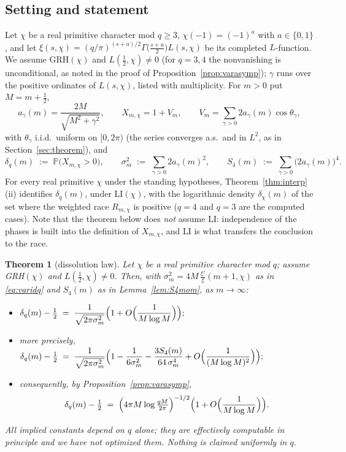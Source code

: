 \documentclass[11pt]{article}
\newtheorem{theorem}{Theorem}
\begin{document}
\subsection*{Setting and statement}

Let $\chi$ be a real primitive character mod $q\ge3$,
$\chi(-1)=(-1)^a$ with $a\in\{0,1\}$, and let
$\xi(s,\chi)=(q/\pi)^{(s+a)/2}\Gamma\bigl(\tfrac{s+a}2\bigr)L(s,\chi)$
be its completed $L$-function. We assume GRH$(\chi)$ and
$L(\tfrac12,\chi)\ne0$ (for $q=3,4$ the nonvanishing is unconditional,
as noted in the proof of Proposition~\ref{prop:varasymp}); $\gamma$
runs over the positive ordinates of $L(s,\chi)$, listed with
multiplicity. For $m>0$ put $M=m+\tfrac12$,
\[
a_\gamma(m)=\frac{2M}{\sqrt{M^2+\gamma^2}},\qquad
X_{m,\chi}=1+V_m,\qquad
V_m=\sum_{\gamma>0}2a_\gamma(m)\cos\theta_\gamma,
\]
with $\theta_\gamma$ i.i.d.\ uniform on $[0,2\pi)$ (the series
converges a.s.\ and in $L^2$, as in Section~\ref{sec:theorem}), and
\[
\delta_q(m)\;:=\;\mathbb P\bigl(X_{m,\chi}>0\bigr),
\qquad
\sigma_m^2\;:=\;\sum_{\gamma>0}2a_\gamma(m)^2,
\qquad
S_4(m)\;:=\;\sum_{\gamma>0}\bigl(2a_\gamma(m)\bigr)^4 .
\]
For every real primitive $\chi$ under the standing hypotheses,
Theorem~\ref{thm:interp}(ii) identifies $\delta_q(m)$, under
LI$(\chi)$, with the logarithmic density $\delta_\chi(m)$ of the set
where
the weighted race $R_{m,\chi}$ is positive ($q=4$ and $q=3$ are the
computed cases). Note that the theorem
below does \emph{not} assume LI: independence of the phases is built
into the definition of $X_{m,\chi}$, and LI is what transfers the
conclusion to the race.

\begin{theorem}[dissolution law]\label{thm:dissolution}
Let $\chi$ be a real primitive character mod $q$; assume GRH$(\chi)$
and $L(\tfrac12,\chi)\ne0$. Then, with
$\sigma_m^2=4M\,\frac{\xi'}{\xi}(m+1,\chi)$ as in
\eqref{eq:varidq} and $S_4(m)$ as in Lemma~\ref{lem:S4mom}, as
$m\to\infty$:
\begin{itemize}
\item[(i)]
$\displaystyle
\delta_q(m)-\tfrac12\;=\;\frac{1}{\sqrt{2\pi\sigma_m^2}}
\Bigl(1+O\Bigl(\frac{1}{M\log M}\Bigr)\Bigr);
$
\item[(ii)] more precisely,
$\displaystyle
\delta_q(m)-\tfrac12\;=\;\frac{1}{\sqrt{2\pi\sigma_m^2}}
\Bigl(1-\frac{1}{6\sigma_m^2}-\frac{3S_4(m)}{64\,\sigma_m^4}
+O\Bigl(\frac{1}{(M\log M)^2}\Bigr)\Bigr);
$
\item[(iii)] consequently, by
Proposition~\ref{prop:varasymp},
\[
\delta_q(m)-\tfrac12\;=\;
\Bigl(4\pi M\log\tfrac{qM}{2\pi}\Bigr)^{-1/2}
\Bigl(1+O\Bigl(\frac{1}{M\log M}\Bigr)\Bigr).
\]
\end{itemize}
All implied constants depend on $q$ alone; they are effectively
computable in principle and we have not optimized them. Nothing is
claimed uniformly in $q$.
\end{theorem}
\end{document}
